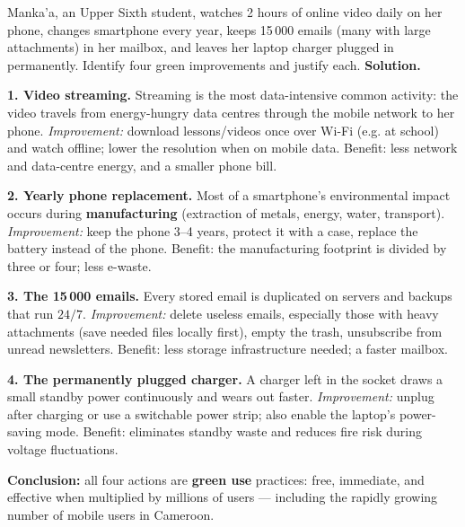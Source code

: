 \documentclass[11pt]{article}
\begin{document}
\begin{exoresolu}
Manka'a, an Upper Sixth student, watches 2 hours of online video daily on her phone, changes smartphone every year, keeps 15\,000 emails (many with large attachments) in her mailbox, and leaves her laptop charger plugged in permanently. Identify four green improvements and justify each.
\tcblower
\textbf{Solution.}\par
\textbf{1. Video streaming.} Streaming is the most data-intensive common activity: the video travels from energy-hungry data centres through the mobile network to her phone. \emph{Improvement:} download lessons/videos once over Wi-Fi (e.g. at school) and watch offline; lower the resolution when on mobile data. Benefit: less network and data-centre energy, and a smaller phone bill.\par
\textbf{2. Yearly phone replacement.} Most of a smartphone's environmental impact occurs during \textbf{manufacturing} (extraction of metals, energy, water, transport). \emph{Improvement:} keep the phone 3--4 years, protect it with a case, replace the battery instead of the phone. Benefit: the manufacturing footprint is divided by three or four; less e-waste.\par
\textbf{3. The 15\,000 emails.} Every stored email is duplicated on servers and backups that run $24/7$. \emph{Improvement:} delete useless emails, especially those with heavy attachments (save needed files locally first), empty the trash, unsubscribe from unread newsletters. Benefit: less storage infrastructure needed; a faster mailbox.\par
\textbf{4. The permanently plugged charger.} A charger left in the socket draws a small standby power continuously and wears out faster. \emph{Improvement:} unplug after charging or use a switchable power strip; also enable the laptop's power-saving mode. Benefit: eliminates standby waste and reduces fire risk during voltage fluctuations.\par
\textbf{Conclusion:} all four actions are \textbf{green use} practices: free, immediate, and effective when multiplied by millions of users — including the rapidly growing number of mobile users in Cameroon.
\end{exoresolu}
\end{document}
